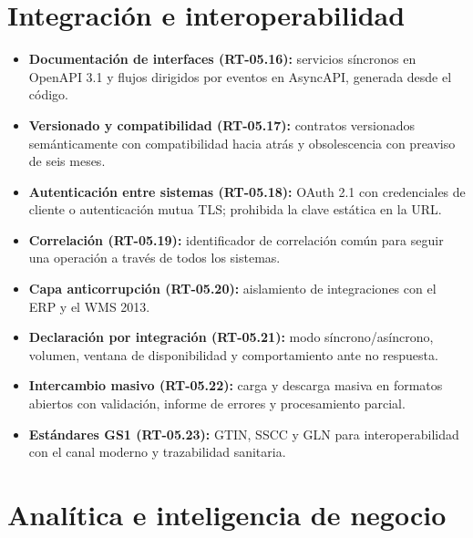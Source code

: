 \section{Integración e interoperabilidad}

\begin{itemize}
  \item \textbf{Documentación de interfaces (RT-05.16):} servicios síncronos en OpenAPI
        3.1 y flujos dirigidos por eventos en AsyncAPI, generada desde el código.
  \item \textbf{Versionado y compatibilidad (RT-05.17):} contratos versionados
        semánticamente con compatibilidad hacia atrás y obsolescencia con preaviso de seis
        meses.
  \item \textbf{Autenticación entre sistemas (RT-05.18):} OAuth 2.1 con credenciales de
        cliente o autenticación mutua TLS; prohibida la clave estática en la URL.
  \item \textbf{Correlación (RT-05.19):} identificador de correlación común para seguir
        una operación a través de todos los sistemas.
  \item \textbf{Capa anticorrupción (RT-05.20):} aislamiento de integraciones con el ERP y
        el WMS 2013.
  \item \textbf{Declaración por integración (RT-05.21):} modo síncrono/asíncrono, volumen,
        ventana de disponibilidad y comportamiento ante no respuesta.
  \item \textbf{Intercambio masivo (RT-05.22):} carga y descarga masiva en formatos
        abiertos con validación, informe de errores y procesamiento parcial.
  \item \textbf{Estándares GS1 (RT-05.23):} GTIN, SSCC y GLN para interoperabilidad con
        el canal moderno y trazabilidad sanitaria.
\end{itemize}

\section{Analítica e inteligencia de negocio}

